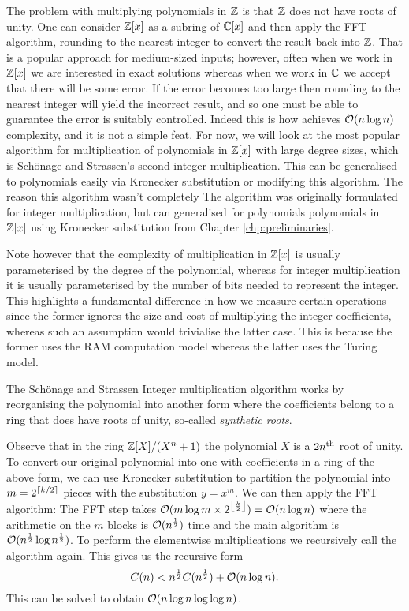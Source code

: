 The problem with multiplying polynomials in ${\mathbb Z}$ is that ${\mathbb Z}$ does not have roots of unity. One can consider ${\mathbb Z}[x]$ as a subring of ${\mathbb C}[x]$ and then apply the FFT algorithm, rounding to the nearest integer to convert the result back into ${\mathbb Z}$. That is a popular approach for medium-sized inputs; however, often when we work in ${\mathbb Z}[x]$ we are interested in exact solutions whereas when we work in ${\mathbb C}$ we accept that there will be some error. If the error becomes too large then rounding to the nearest integer will yield the incorrect result, and so one must be able to guarantee the error is suitably controlled. Indeed this is how \cite{nlogn} achieves $\mathcal O(n\log n)$ complexity, and it is not a simple feat. For now, we will look at the most popular algorithm for multiplication of polynomials in ${\mathbb Z}[x]$ with large degree sizes, which is Sch\"{o}nage and Strassen's second integer multiplication. This can be generalised to polynomials easily via Kronecker substitution or modifying this algorithm. The reason this algorithm wasn't completely The algorithm was originally formulated for integer multiplication, but can generalised for polynomials polynomials in ${\mathbb Z}[x]$ using Kronecker substitution from Chapter \ref{chp:preliminaries}.

\medskip


Note however that the complexity of multiplication in ${\mathbb Z}[x]$ is usually parameterised by the degree of the polynomial, whereas for integer multiplication it is usually parameterised by the number of bits needed to represent the integer. This highlights a fundamental difference in how we measure certain operations since the former ignores the size and cost of multiplying the integer coefficients, whereas such an assumption would trivialise the latter case. This is because the former uses the RAM computation model whereas the latter uses the Turing model. 

The Sch\"{o}nage and Strassen Integer multiplication algorithm works by reorganising the polynomial into another form where the coefficients belong to a ring that does have roots of unity, so-called \emph{synthetic roots}.

Observe that in the ring ${\mathbb Z}[X] / (X^n + 1)$ the polynomial $X$ is a $2n^{\textrm{th}}$ root of unity. To convert our original polynomial into one with coefficients in a ring of the above form, we can use Kronecker substitution to partition the polynomial into $m = 2^{\left \lceil k/2 \right \rceil}$ pieces with the substitution $y = x^m$. We can then apply the FFT algorithm: The FFT step takes $\mathcal O(m\log m \times 2^{\left \lfloor \frac{k}{2} \right \rfloor}) = \mathcal O(n \log n)$ where the arithmetic on the $m$ blocks is $\mathcal O(n^{\frac{1}{2}})$ time and the main algorithm is $\mathcal O(n^{\frac{1}{2}}\log n^{\frac{1}{2}})$. To perform the elementwise multiplications we recursively call the algorithm again. This gives us the recursive form
\[
    C(n) < n^{\frac{1}{2}}C(n^{\frac{1}{2}}) + \mathcal O(n \log n).
\]
This can be solved to obtain $\mathcal O(n \log n \log \log n)$.

